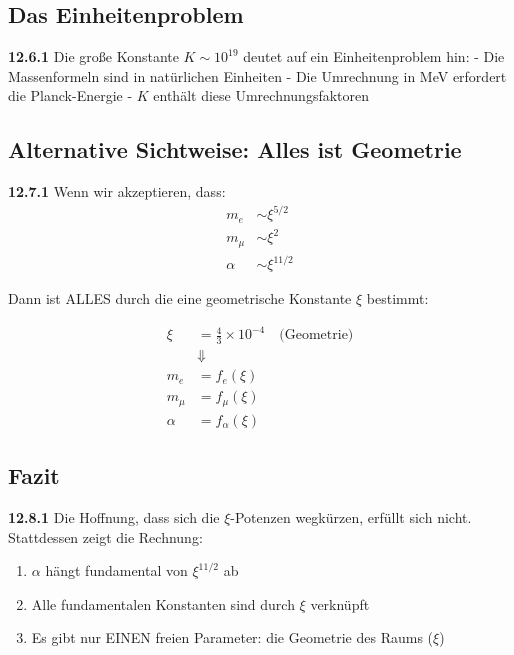 \documentclass[12pt,a4paper]{article}
\begin{document}
\subsection{Das Einheitenproblem}

\noindent \textbf{12.6.1} Die große Konstante $K \sim 10^{19}$ deutet auf ein Einheitenproblem hin:
- Die Massenformeln sind in natürlichen Einheiten
- Die Umrechnung in MeV erfordert die Planck-Energie
- $K$ enthält diese Umrechnungsfaktoren

\subsection{Alternative Sichtweise: Alles ist Geometrie}

\noindent \textbf{12.7.1} Wenn wir akzeptieren, dass:
\begin{align}
	m_e &\sim \xi^{5/2} \\
	m_\mu &\sim \xi^2 \\
	\alpha &\sim \xi^{11/2}
\end{align}

Dann ist ALLES durch die eine geometrische Konstante $\xi$ bestimmt:

\begin{equation}
	\boxed{
		\begin{aligned}
			\xi &= \frac{4}{3} \times 10^{-4} \quad \text{(Geometrie)} \\
			&\Downarrow \\
			m_e &= f_e(\xi) \\
			m_\mu &= f_\mu(\xi) \\
			\alpha &= f_\alpha(\xi)
		\end{aligned}
	}
\end{equation}

\subsection{Fazit}

\noindent \textbf{12.8.1} Die Hoffnung, dass sich die $\xi$-Potenzen wegkürzen, erfüllt sich nicht. Stattdessen zeigt die Rechnung:

\begin{enumerate}
	\item $\alpha$ hängt fundamental von $\xi^{11/2}$ ab
	\item Alle fundamentalen Konstanten sind durch $\xi$ verknüpft
	\item Es gibt nur EINEN freien Parameter: die Geometrie des Raums ($\xi$)
\end{enumerate}
\end{document}
